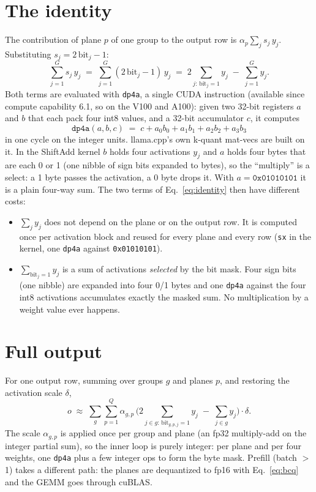 \documentclass[11pt]{article}
\begin{document}
\section{The identity}
The contribution of plane $p$ of one group to the output row is $\alpha_p \sum_j s_j\, y_j$. Substituting
$s_j = 2\,\mathrm{bit}_j - 1$:
\begin{equation}
\sum_{j=1}^{G} s_j\, y_j \;=\; \sum_{j=1}^{G} (2\,\mathrm{bit}_j - 1)\, y_j
\;=\; 2 \sum_{j:\,\mathrm{bit}_j = 1} y_j \;-\; \sum_{j=1}^{G} y_j .
\label{eq:identity}
\end{equation}
Both terms are evaluated with \texttt{dp4a}, a single CUDA instruction (available since compute capability 6.1, so on
the V100 and A100): given two 32-bit registers $a$ and $b$ that each pack four int8 values, and a 32-bit accumulator
$c$, it computes
\begin{equation}
\texttt{dp4a}(a, b, c) \;=\; c + a_0 b_0 + a_1 b_1 + a_2 b_2 + a_3 b_3
\label{eq:dp4a}
\end{equation}
in one cycle on the integer units. llama.cpp's own k-quant mat-vecs are built on it. In the ShiftAdd kernel $b$ holds
four activations $y_j$ and $a$ holds four bytes that are each 0 or 1 (one nibble of sign bits expanded to bytes), so
the ``multiply'' is a select: a 1 byte passes the activation, a 0 byte drops it. With $a = \texttt{0x01010101}$ it is
a plain four-way sum. The two terms of Eq.~\eqref{eq:identity} then have different costs:
\begin{itemize}
\item $\sum_j y_j$ does not depend on the plane or on the output row. It is computed once per activation block and reused
  for every plane and every row (\texttt{sx} in the kernel, one \texttt{dp4a} against \texttt{0x01010101}).
\item $\sum_{\mathrm{bit}_j=1} y_j$ is a sum of activations \emph{selected} by the bit mask. Four sign bits (one nibble)
  are expanded into four 0/1 bytes and one \texttt{dp4a} against the four int8 activations accumulates exactly the
  masked sum. No multiplication by a weight value ever happens.
\end{itemize}

\section{Full output}
For one output row, summing over groups $g$ and planes $p$, and restoring the activation scale $\delta$,
\begin{equation}
o \;\approx\; \sum_{g} \sum_{p=1}^{Q} \alpha_{g,p}\,
\Big( 2 \sum_{j \in g:\, \mathrm{bit}_{g,p,j}=1} y_j \;-\; \sum_{j \in g} y_j \Big) \cdot \delta .
\end{equation}
The scale $\alpha_{g,p}$ is applied once per group and plane (an fp32 multiply-add on the integer partial sum), so the
inner loop is purely integer: per plane and per four weights, one \texttt{dp4a} plus a few integer ops to form the byte
mask. Prefill (batch $>$ 1) takes a different path: the planes are dequantized to fp16 with Eq.~\eqref{eq:bcq} and the
GEMM goes through cuBLAS.
\end{document}
